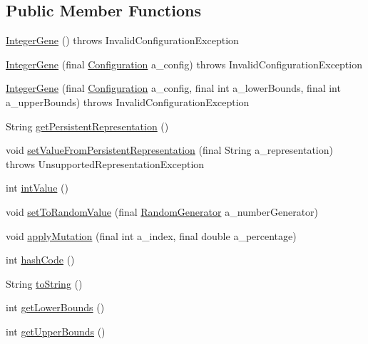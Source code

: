 \subsection*{Public Member Functions}
\begin{DoxyCompactItemize}
\item 
\hyperlink{classorg_1_1jgap_1_1impl_1_1_integer_gene_ae8edebc964e1c4e91951ecda1f26109c}{Integer\-Gene} ()  throws Invalid\-Configuration\-Exception 
\item 
\hyperlink{classorg_1_1jgap_1_1impl_1_1_integer_gene_afe1aeaaa89646a83a34edb94cd58b6af}{Integer\-Gene} (final \hyperlink{classorg_1_1jgap_1_1_configuration}{Configuration} a\-\_\-config)  throws Invalid\-Configuration\-Exception 
\item 
\hyperlink{classorg_1_1jgap_1_1impl_1_1_integer_gene_affb4e686eaf110e8451f4afab7c0d2d6}{Integer\-Gene} (final \hyperlink{classorg_1_1jgap_1_1_configuration}{Configuration} a\-\_\-config, final int a\-\_\-lower\-Bounds, final int a\-\_\-upper\-Bounds)  throws Invalid\-Configuration\-Exception 
\item 
String \hyperlink{classorg_1_1jgap_1_1impl_1_1_integer_gene_a81f6bb7889e353d5fe2a191b2fe530bd}{get\-Persistent\-Representation} ()
\item 
void \hyperlink{classorg_1_1jgap_1_1impl_1_1_integer_gene_a68a36ac6573668c924a01c99209dcd14}{set\-Value\-From\-Persistent\-Representation} (final String a\-\_\-representation)  throws Unsupported\-Representation\-Exception 
\item 
int \hyperlink{classorg_1_1jgap_1_1impl_1_1_integer_gene_a90c518c0ed7c08016323ea88b9fb4078}{int\-Value} ()
\item 
void \hyperlink{classorg_1_1jgap_1_1impl_1_1_integer_gene_a7bb0f704f675017aee7fec0ab7e88310}{set\-To\-Random\-Value} (final \hyperlink{interfaceorg_1_1jgap_1_1_random_generator}{Random\-Generator} a\-\_\-number\-Generator)
\item 
void \hyperlink{classorg_1_1jgap_1_1impl_1_1_integer_gene_af36f1f47459727cb4aefa0140ef03585}{apply\-Mutation} (final int a\-\_\-index, final double a\-\_\-percentage)
\item 
int \hyperlink{classorg_1_1jgap_1_1impl_1_1_integer_gene_a5a2ddbdf4b8deab10c3c7c7c6ee0a4b7}{hash\-Code} ()
\item 
String \hyperlink{classorg_1_1jgap_1_1impl_1_1_integer_gene_a877a71e49546005e6cc35230fc5d470d}{to\-String} ()
\item 
int \hyperlink{classorg_1_1jgap_1_1impl_1_1_integer_gene_ada11b926a9171e6bc6a1d16a28b62d89}{get\-Lower\-Bounds} ()
\item 
int \hyperlink{classorg_1_1jgap_1_1impl_1_1_integer_gene_aeadfb567a20ff5e7000d242f4c392ddf}{get\-Upper\-Bounds} ()
\end{DoxyCompactItemize}
